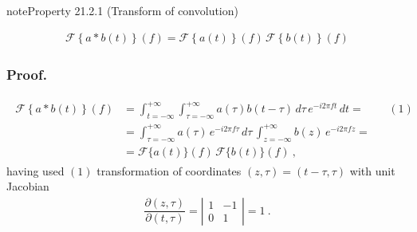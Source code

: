 \documentclass[letterpaper,10pt,english]{jupyterBook}
\begin{document}
\sphinxAtStartPar
{}

\sphinxAtStartPar
{}

\sphinxAtStartPar
{}

\sphinxAtStartPar
{}
\label{ch/complex/fourier-transform:transform:fourier:convolution}
\begin{sphinxadmonition}{note}{Property 21.2.1 (Transform of convolution)}


\begin{equation*}
\begin{split}\mathscr{F}\left\{ a \ast b (t)  \right\}(f) = \mathscr{F}\left\{ a(t) \right\}(f) \, \mathscr{F}\left\{ b(t) \right\}(f)\end{split}
\end{equation*}\end{sphinxadmonition}
\subsubsection*{Proof.}
\begin{equation*}
\begin{split}\begin{aligned}
  \mathscr{F}\left\{ a \ast b (t)  \right\}(f)
  & = \int_{t = -\infty}^{+\infty} \int_{\tau=-\infty}^{+\infty} a(\tau) b(t - \tau) \, d \tau \, e^{-i 2 \pi f t} \, d t = && (1) \\
  & = \int_{\tau=-\infty}^{+\infty} a(\tau) \, e^{-i 2 \pi f \tau} \, d \tau \, \int_{z = -\infty}^{+\infty} b(z) \, e^{-i 2 \pi f z} = \\
  & = \mathscr{F}\{ a(t) \}(f) \, \mathscr{F}\{ b(t) \} (f) \ ,
\end{aligned}\end{split}
\end{equation*}
\sphinxAtStartPar
having used \((1)\) transformation of coordinates \((z, \tau) = (t - \tau, \tau)\) with unit Jacobian
\begin{equation*}
\begin{split}\dfrac{\partial(z, \tau)}{\partial(t, \tau)} = \left|\begin{matrix} 1 & - 1 \\ 0 & 1 \end{matrix}\right| = 1 \ .\end{split}
\end{equation*}
\end{document}
